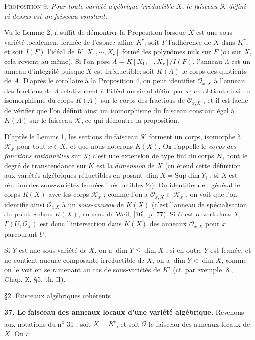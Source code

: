\textsc{Proposition} 9. \textit{Pour toute variété algébrique irréductible $X$, le faisceau $\mathcal{K}$ défini ci-dessus est un faisceau constant.}

Vu le Lemme 2, il suffit de démontrer la Proposition lorsque $X$ est une sous-variété localement fermée de l'espace affine $K^r$; soit $F$ l'adhérence de $X$ dans $K^r$, et soit $I(F)$ l'idéal de $K[X_1 , \cdots , X_r]$ formé des polynômes nuls sur $F$ (ou sur $X$, cela revient au même). Si l'on pose $A = K[X_1 , \cdots , X_r]/I(F)$, l'anneau $A$ est un anneau d'intégrité puisque $X$ est irréductible; soit $K(A)$ le corps des quotients de $A$. D'après le corollaire à la Proposition 4, on peut identifier $\mathcal{O}_{x,X}$
à l'anneau des fractions de $A$ relativement à l'idéal maximal défini par $x$; on obtient ainsi un isomorphisme du corps $K(A)$ sur le corps des fractions de $\mathcal{O}_{x,X}$ , et il est facile de vérifier que l'on définit ainsi un isomorphisme du faisceau constant égal à $K(A)$ sur le faisceau $\mathcal{K}$, ce qui démontre la proposition.

D'après le Lemme 1, les sections du faisceau $\mathcal{K}$ forment un corps, isomorphe à $\mathcal{K}_x$ pour tout $x \in X$, et que nous noterons $K(X)$. On l'appelle le \textit{corps des fonctions rationnelles} sur $X$; c'est une extension de type fini du corps $K$, dont le degré de transcendance sur $K$ est la \textit{dimension} de $X$ (on étend cette définition aux variétés algébriques réductibles en posant $\dim X = \mathrm{Sup} \dim Y_i$ , si $X$ est réunion des sous-variétés fermées irréductibles $Y_i$). On identifiera en général le corps $K(X)$ avec les corps $\mathcal{K}_x$ ; comme l'on a $\mathcal{O}_{x,X} \subset \mathcal{K}_x$ , on voit que l'on identifie ainsi $\mathcal{O}_{x.X}$ à un \textit{sous-anneau} de $K(X)$ (c'est l'anneau de spécialisation du point $x$ dans $K(X)$, au sens de Weil, [16], p. 77). Si $U$ est ouvert dans $X$, $\Gamma(U, \mathcal{O}_X)$ est donc l'intersection dans $K(X)$ des anneaux $\mathcal{O}_{x,X}$ pour $x$ parcourant $U$.

Si $Y$ est une sous-variété de $X$, on a $\dim Y \leqq \dim X$ ; si en outre $Y$ est fermée, et ne contient aucune composante irréductible de $X$, on a $\dim Y < \dim X$, comme on le voit en se ramenant au cas de sous-variétés de $K^r$ (cf. par exemple [8], Chap. X, \S5, th. II).


\S2. Faisceaux algébriques cohérents

\textbf{37. Le faisceau des anneaux locaux d'une variété algébrique.} Revenons aux notations du n\textsuperscript{o} 31 : soit $X = K^r$, et soit $\mathcal{O}$ le faisceau des anneaux locaux de $X$. On a:

